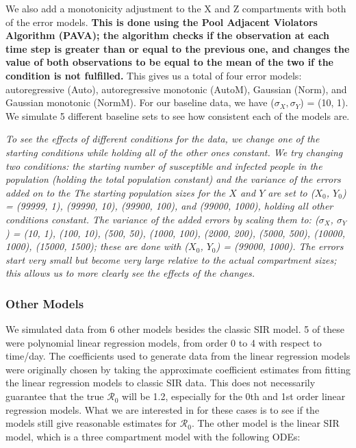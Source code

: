 \documentclass[12pt]{article}
\newcommand{\rr}{\ensuremath{\mathcal{R}_0}}
\begin{document}
We also add a monotonicity adjustment to the X and Z compartments with both of the error models. \textbf{This is done using the Pool Adjacent Violators Algorithm (PAVA); the algorithm checks if the observation at each time step is greater than or equal to the previous one, and changes the value of both observations to be equal to the mean of the two if the condition is not fulfilled.} This gives us a total of four error models: autoregressive (Auto), autoregressive monotonic (AutoM), Gaussian (Norm), and Gaussian monotonic (NormM). For our baseline data, we have ($\sigma_X, \sigma_Y$) = (10, 1). We simulate 5 different baseline sets to see how consistent each of the models are.

\textit{To see the effects of different conditions for the data, we change one of the starting conditions while holding all of the other ones constant. We try changing two conditions: the starting number of susceptible and infected people in the population (holding the total population constant) and the variance of the errors added on to the The starting population sizes for the $X$ and $Y$ are set to ($X_0$, $Y_0$) =  (99999, 1), (99990, 10), (99900, 100), and (99000, 1000), holding all other conditions constant. The variance of the added errors by scaling them to: ($\sigma_X$, $\sigma_Y$) = (10, 1), (100, 10), (500, 50), (1000, 100), (2000, 200), (5000, 500), (10000, 1000), (15000, 1500); these are done with ($X_0$, $Y_0$) = (99000, 1000). The errors start very small but become very large relative to the actual compartment sizes; this allows us to more clearly see the effects of the changes.}







\subsubsection{Other Models}
We simulated data from 6 other models besides the classic SIR model. 5 of these were polynomial linear regression models, from order 0 to 4 with respect to time/day. The coefficients used to generate data from the linear regression models were originally chosen by taking the approximate coefficient estimates from fitting the linear regression models to classic SIR data. This does not necessarily guarantee that the true $\rr$ will be 1.2, especially for the 0th and 1st order linear regression models. What we are interested in for these cases is to see if the models still give reasonable estimates for $\rr$. The other model is the linear SIR model, which is a three compartment model with the following ODEs:
\end{document}
